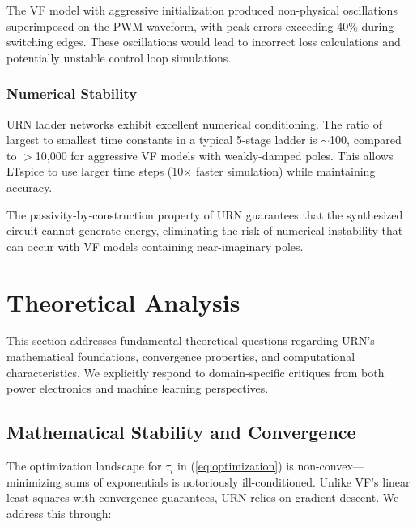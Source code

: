 \documentclass{ieeeaccess}
\begin{document}
The VF model with aggressive initialization produced non-physical oscillations superimposed on the PWM waveform, with peak errors exceeding 40\% during switching edges. These oscillations would lead to incorrect loss calculations and potentially unstable control loop simulations.

\subsubsection{Numerical Stability}
URN ladder networks exhibit excellent numerical conditioning. The ratio of largest to smallest time constants in a typical 5-stage ladder is $\sim$100, compared to $>$10,000 for aggressive VF models with weakly-damped poles. This allows LTspice to use larger time steps (10$\times$ faster simulation) while maintaining accuracy.

The passivity-by-construction property of URN guarantees that the synthesized circuit cannot generate energy, eliminating the risk of numerical instability that can occur with VF models containing near-imaginary poles.

\section{Theoretical Analysis}
\label{sec:theory}

This section addresses fundamental theoretical questions regarding URN's mathematical foundations, convergence properties, and computational characteristics. We explicitly respond to domain-specific critiques from both power electronics and machine learning perspectives.

\subsection{Mathematical Stability and Convergence}
\label{sec:convergence}

The optimization landscape for $\tau_i$ in (\ref{eq:optimization}) is non-convex---minimizing sums of exponentials is notoriously ill-conditioned. Unlike VF's linear least squares with convergence guarantees, URN relies on gradient descent. We address this through:
\end{document}
